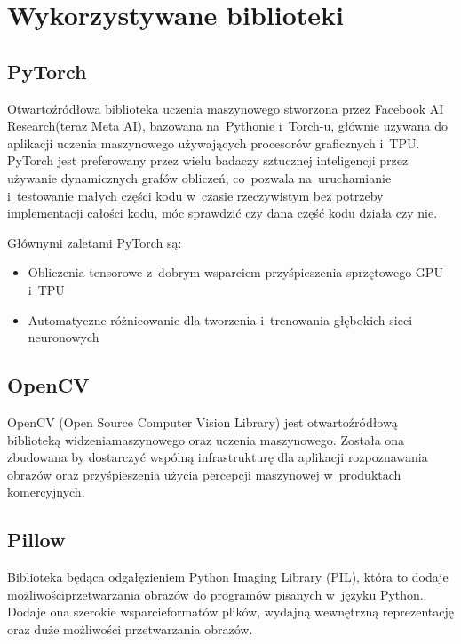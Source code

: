\section{Wykorzystywane biblioteki}

\subsection*{PyTorch}
Otwartoźródłowa biblioteka uczenia maszynowego stworzona przez Facebook AI Research\linebreak(teraz Meta AI), bazowana na~Pythonie i~Torch-u, głównie używana do aplikacji uczenia maszynowego używających procesorów graficznych i~TPU. PyTorch jest preferowany przez wielu badaczy sztucznej inteligencji przez używanie dynamicznych grafów obliczeń, co~pozwala na~uruchamianie i~testowanie małych części kodu w~czasie rzeczywistym bez potrzeby implementacji całości kodu, móc sprawdzić czy dana część kodu działa czy nie.

Głównymi zaletami PyTorch są:
\begin{itemize}
	\item Obliczenia tensorowe z~dobrym wsparciem przyśpieszenia sprzętowego GPU i~TPU
	\item Automatyczne różnicowanie dla tworzenia i~trenowania głębokich sieci neuronowych
\end{itemize}

\subsection*{OpenCV}
OpenCV (Open Source Computer Vision Library) jest otwartoźródłową biblioteką widzenia\linebreak maszynowego oraz uczenia maszynowego. Została ona zbudowana by dostarczyć wspólną infrastrukturę dla aplikacji rozpoznawania obrazów oraz przyśpieszenia użycia percepcji maszynowej w~produktach komercyjnych.

\subsection*{Pillow}
Biblioteka będąca odgałęzieniem Python Imaging Library (PIL), która to dodaje możliwości\linebreak przetwarzania obrazów do programów pisanych w~języku Python. Dodaje ona szerokie wsparcie\linebreak formatów plików, wydajną wewnętrzną reprezentację oraz duże możliwości przetwarzania obrazów. 


